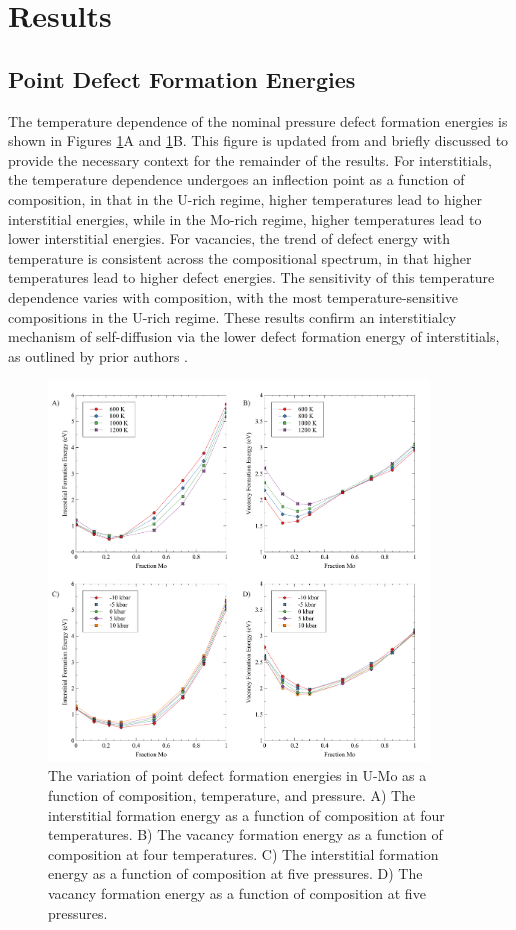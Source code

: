 \documentclass[review]{elsarticle}
\providecommand{\DIFaddend}{\protect\color{black}} %
\DeclareRobustCommand{\DIFaddend}{\DIFOaddend \let\includegraphics\DIFOincludegraphics} %
\begin{document}
\DIFaddend \section{Results}\label{sec3}
\subsection{Point Defect Formation Energies}

The temperature dependence of the nominal pressure defect formation energies is shown in Figures \ref{fig:A}A and \ref{fig:A}B. This figure is updated from \cite{beelerMRSadv} and briefly discussed to provide the necessary context for the remainder of the results. For interstitials, the temperature dependence undergoes an inflection point as a function of composition, in that in the U-rich regime, higher temperatures lead to higher interstitial energies, while in the Mo-rich regime, higher temperatures lead to lower interstitial energies. For vacancies, the trend of defect energy with temperature is consistent across the compositional spectrum, in that higher temperatures lead to higher defect energies. The sensitivity of this temperature dependence varies with composition, with the most temperature-sensitive compositions in the U-rich regime. These results confirm an interstitialcy mechanism of self-diffusion via the lower defect formation energy of interstitials, as outlined by prior authors \cite{park2021,starikov2018}. 

\begin{figure}[h!]
\centering
\includegraphics[width=0.9\textwidth]{figA.pdf}
\caption{The variation of point defect formation energies in U-Mo as a function of composition, temperature, and pressure. A) The interstitial formation energy as a function of composition at four temperatures. B) The vacancy formation energy as a function of composition at four temperatures. C) The interstitial formation energy as a function of composition at five pressures. D) The vacancy formation energy as a function of composition at five pressures.} 
\label{fig:A}
\end{figure}
\end{document}
